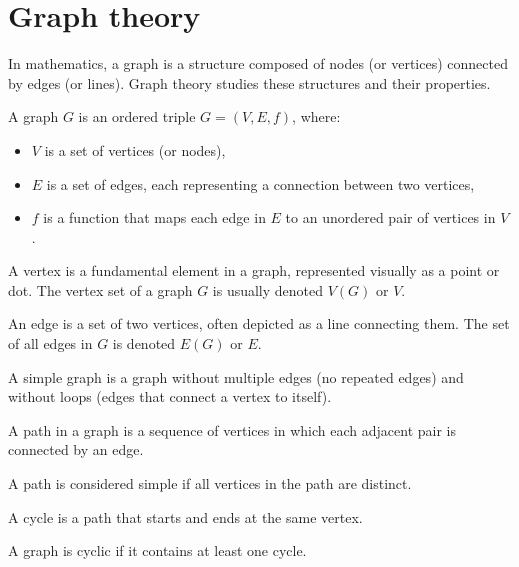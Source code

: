 \section{Graph theory}

In mathematics, a graph is a structure composed of nodes (or vertices) connected by edges (or lines). Graph theory studies these structures and their properties.
\begin{definition}
    A graph $G$ is an ordered triple $G = (V, E, f)$, where:
\end{definition}
\begin{itemize}
    \item $V$ is a set of vertices (or nodes),
    \item $E$ is a set of edges, each representing a connection between two vertices,
    \item $f$ is a function that maps each edge in $E$ to an unordered pair of vertices in $V$.
\end{itemize}
\begin{definition}
    A vertex is a fundamental element in a graph, represented visually as a point or dot. 
    The vertex set of a graph $G$ is usually denoted $V(G)$ or $V$.
\end{definition}
\begin{definition}
    An edge is a set of two vertices, often depicted as a line connecting them. 
    The set of all edges in $G$ is denoted $E(G)$ or $E$.
\end{definition}
\begin{definition}
    A simple graph is a graph without multiple edges (no repeated edges) and without loops (edges that connect a vertex to itself).
\end{definition}
\begin{definition}
    A path in a graph is a sequence of vertices in which each adjacent pair is connected by an edge.
\end{definition}
\begin{definition}
    A path is considered simple if all vertices in the path are distinct.
\end{definition}
\begin{definition}
    A cycle is a path that starts and ends at the same vertex.
\end{definition}
\begin{definition}
    A graph is cyclic if it contains at least one cycle.
\end{definition}
